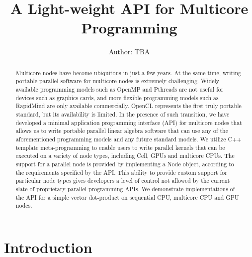 \documentclass[10pt,conference,letterpaper]{IEEEtran}
\title{A Light-weight API for Multicore Programming}
\author{
Author: TBA
}
\begin{document}
\maketitle
%
\begin{abstract} 
Multicore nodes have become ubiquitous in just a few years.  At the same time, writing portable parallel software for multicore nodes is extremely challenging.  Widely available programming models such as OpenMP and Pthreads are not useful for devices such as graphics cards, and more flexible programming models such as RapidMind are only available commercially.  OpenCL represents the first truly portable standard, but its availability is limited.  In the presence of such transition, we have developed a minimal application programming interface (API) for multicore nodes that allows us to write portable parallel linear algebra software that can use any of the aforementioned programming models and any future standard models. We utilize C++ template meta-programming to enable users to write parallel kernels that can be executed on a variety of node types, including Cell, GPUs and multicore CPUs. The support for a parallel node is provided by implementing a Node object, according to the requirements specified by the API. This ability to provide custom support for particular node types gives developers a level of control not allowed by the current slate of proprietary parallel programming APIs. We demonstrate implementations of the API for a simple vector dot-product on sequential CPU, multicore CPU and GPU nodes.
\end{abstract}

%
\section{Introduction}
%
\end{document}
